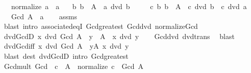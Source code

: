 \begin{isabellebody}
\ \ \ {\isachardoublequoteopen}normalize\ a\ {\isacharequal}{\kern0pt}\ a{\isachardoublequoteclose}\isanewline
\ \ \ {\isachardoublequoteopen}{\isasymAnd}b{\isachardot}{\kern0pt}\ b\ {\isasymin}\ A\ {\isasymLongrightarrow}\ a\ dvd\ b{\isachardoublequoteclose}\isanewline
\ \ \ \ \ {\isachardoublequoteopen}{\isasymAnd}c{\isachardot}{\kern0pt}\ {\isacharparenleft}{\kern0pt}{\isasymAnd}b{\isachardot}{\kern0pt}\ b\ {\isasymin}\ A\ {\isasymLongrightarrow}\ c\ dvd\ b{\isacharparenright}{\kern0pt}\ {\isasymLongrightarrow}\ c\ dvd\ a{\isachardoublequoteclose}\isanewline
\ \ \ {\isachardoublequoteopen}Gcd\ A\ {\isacharequal}{\kern0pt}\ a{\isachardoublequoteclose}\isanewline
%
\isadelimproof
\ \ %
\endisadelimproof
%
\isatagproof
{}\isamarkupfalse%
\ assms\ \isamarkupfalse%
\ {\isacharparenleft}{\kern0pt}blast\ intro{\isacharcolon}{\kern0pt}\ associated{\isacharunderscore}{\kern0pt}eqI\ Gcd{\isacharunderscore}{\kern0pt}greatest\ Gcd{\isacharunderscore}{\kern0pt}dvd\ normalize{\isacharunderscore}{\kern0pt}Gcd{\isacharparenright}{\kern0pt}%
\endisatagproof
{\isafoldproof}%
%
\isadelimproof
\isanewline
%
\endisadelimproof
\isanewline
{}\isamarkupfalse%
\ dvd{\isacharunderscore}{\kern0pt}GcdD{\isacharcolon}{\kern0pt}\ {\isachardoublequoteopen}x\ dvd\ Gcd\ A\ {\isasymLongrightarrow}\ y\ {\isasymin}\ A\ {\isasymLongrightarrow}\ x\ dvd\ y{\isachardoublequoteclose}\isanewline
%
\isadelimproof
\ \ %
\endisadelimproof
%
\isatagproof
{}\isamarkupfalse%
\ Gcd{\isacharunderscore}{\kern0pt}dvd\ dvd{\isacharunderscore}{\kern0pt}trans\ \isamarkupfalse%
\ blast%
\endisatagproof
{\isafoldproof}%
%
\isadelimproof
\isanewline
%
\endisadelimproof
\isanewline
{}\isamarkupfalse%
\ dvd{\isacharunderscore}{\kern0pt}Gcd{\isacharunderscore}{\kern0pt}iff{\isacharcolon}{\kern0pt}\ {\isachardoublequoteopen}x\ dvd\ Gcd\ A\ {\isasymlongleftrightarrow}\ {\isacharparenleft}{\kern0pt}{\isasymforall}y{\isasymin}A{\isachardot}{\kern0pt}\ x\ dvd\ y{\isacharparenright}{\kern0pt}{\isachardoublequoteclose}\isanewline
%
\isadelimproof
\ \ %
\endisadelimproof
%
\isatagproof
{}\isamarkupfalse%
\ {\isacharparenleft}{\kern0pt}blast\ dest{\isacharcolon}{\kern0pt}\ dvd{\isacharunderscore}{\kern0pt}GcdD\ intro{\isacharcolon}{\kern0pt}\ Gcd{\isacharunderscore}{\kern0pt}greatest{\isacharparenright}{\kern0pt}%
\endisatagproof
{\isafoldproof}%
%
\isadelimproof
\isanewline
%
\endisadelimproof
\isanewline
{}\isamarkupfalse%
\ Gcd{\isacharunderscore}{\kern0pt}mult{\isacharcolon}{\kern0pt}\ {\isachardoublequoteopen}Gcd\ {\isacharparenleft}{\kern0pt}{\isacharparenleft}{\kern0pt}{\isacharasterisk}{\kern0pt}{\isacharparenright}{\kern0pt}\ c\ {\isacharbackquote}{\kern0pt}\ A{\isacharparenright}{\kern0pt}\ {\isacharequal}{\kern0pt}\ normalize\ {\isacharparenleft}{\kern0pt}c\ {\isacharasterisk}{\kern0pt}\ Gcd\ A{\isacharparenright}{\kern0pt}{\isachardoublequoteclose}\isanewline

\end{isabellebody}
